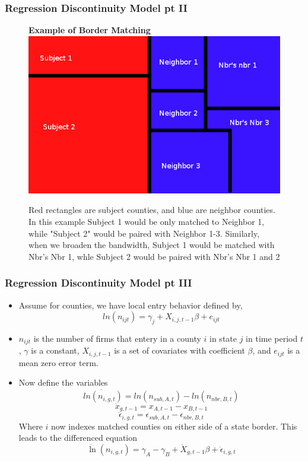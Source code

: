 \documentclass{beamer}
\begin{document}
\begin{frame}
\frametitle{Regression Discontinuity Model pt II}
\begin{figure}[h]\label{rb}
    \centering
    \textbf{Example of Border Matching}
    \includegraphics[scale = 0.35]{../../analysis/output/borders_temp.png}
    \caption{Red rectangles are subject counties, and blue are neighbor counties. In this example Subject 1 would be only matched to Neighbor 1, while "Subject 2" would be paired with Neighbor 1-3. Similarly, when we broaden the bandwidth, Subject 1 would be matched with Nbr's Nbr 1, whle Subject 2 would be paired with Nbr's Nbr 1 and 2}
\end{figure}
\end{frame}

\begin{frame}
\frametitle{Regression Discontinuity Model pt III}
\begin{itemize}
\item Assume for counties, we have local entry behavior defined by,
$$ ln(n_{ijt}) = \gamma_{j}+X_{i,j,t-1}\beta + e_{ijt}$$
\item $n_{ijt}$ is the number of firms that entery in a county $i$ in state $j$ in time period $t$, $\gamma$ is a constant, $X_{i,j,t-1}$ is a set of covariates with coefficient $\beta$, and $e_{ijt}$ is a mean zero error term.
\item Now define the variables
 $$\ddot{ln(n_{i,g,t})} = ln(n_{sub,A,t})-ln(n_{nbr,B,t})$$
 $$\ddot x_{g,t-1} = x_{A,t-1}-x_{B,t-1}$$
 $$\ddot \epsilon_{i,g,t} = \epsilon_{sub,A,t}-\epsilon_{nbr,B,t}$$
Where $i$ now indexes matched counties on either side of a state border. This leads to the differenced equation
\begin{equation}\label{fe}
\ddot \ln(n_{i,g,t}) = \gamma_{A}-\gamma_{B}+\ddot X_{g,t-1}\beta + \ddot \epsilon_{i,g,t}
\end{equation}
\end{itemize}
\end{frame}
\end{document}
